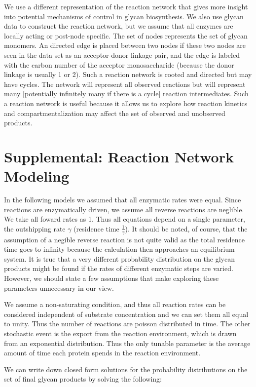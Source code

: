 \documentclass{article}
\begin{document}
We use a different representation of the reaction network that gives more insight into potential mechanisms of control in glycan biosynthesis. We also use glycan data to construct the reaction network, but we assume that all enzymes are locally acting or post-node specific. The set of nodes represents the set of glycan monomers. An directed edge is placed between two nodes if these two nodes are seen in the data set as an acceptor-donor linkage pair, and the edge is labeled with the carbon number of the acceptor monosaccharide (because the donor linkage is usually 1 or 2). Such a reaction network is rooted and directed but may have cycles. The network will represent all observed reactions but will represent many [potentially infinitely many if there is a cycle] reaction intermediates. Such a reaction network is useful because it allows us to explore how reaction kinetics and compartmentalization may affect the set of observed and unobserved products.

\section*{Supplemental: Reaction Network Modeling}
In the following models we assumed that all enzymatic rates were equal. Since reactions are enzymatically driven, we assume all reverse reactions are neglible. We take all foward rates as 1. Thus all equations depend on a single parameter, the outshipping rate $\gamma$ (residence time $\frac{1}{\gamma}$). It should be noted, of course, that the assumption of a negible reverse reaction is not quite valid as the total residence time goes to infinity because the calculation then approaches an equilibrium system. It is true that a very different probability distribution on the glycan products might be found if the rates of different enzymatic steps are varied. However, we should state a few assumptions that make exploring these parameters unnecessary in our view. 

We assume a non-saturating condition, and thus all reaction rates can be considered independent of substrate concentration and we can set them all equal to unity. Thus the number of reactions are poisson distributed in time. The other stochastic event is the export from the reaction environment, which is drawn from an exponential distribution. Thus the only tunable parameter is the average amount of time each protein spends in the reaction environment. 

We can write down closed form solutions for the probability distributions on the set of final glycan products by solving the following:
\end{document}
